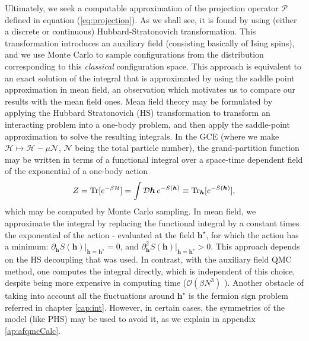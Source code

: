Ultimately, we seek a computable approximation of the projection operator $\mathcal{P}$ defined in equation (\ref{eq:projection}).
As we shall see, it is found by using (either a discrete or continuous) Hubbard-Stratonovich transformation.
This transformation introduces an auxiliary field (consisting basically of Ising spins), and we use Monte Carlo to sample configurations from the distribution corresponding to this \emph{classical} configuration space.
This approach is equivalent to an exact solution of the integral that is approximated by using the saddle point approximation in mean field, an observation which motivates us to compare our results with the mean field ones.
Mean field theory may be formulated by applying the Hubbard Stratonovich (HS)  transformation to transform an interacting problem into a one-body problem, and then apply the saddle-point approximation to solve the resulting integrals.
In the \acs{GCE} (where we make $\mathcal{H} \mapsto \mathcal{H} - \mu \mathcal{N}$, $\mathcal{N}$ being the total particle number), the grand-partition function may be written in terms of a functional integral over a space-time dependent field of the exponential of a one-body action
\begin{equation}
Z = \operatorname{Tr} [ e^{-\beta \mathcal{H} } ] = \int \mathcal{D}\bm h \, e^{-S(\bm h) }  \equiv \operatorname{Tr}_{\bm h} [ e^{-S(\bm h)} ],
\end{equation}
which may be computed by Monte Carlo sampling.
In mean field, we approximate the integral by replacing the functional integral by a constant times the exponential of the action - evaluated at the field $\bm h^\star$, for which the action has a minimum: $\partial_{\bm h} S( \bm h ) |_{\bm h = \bm h^\star} = 0$, and $\partial_{\bm h}^2 S( \bm h ) |_{\bm h = \bm h^\star} > 0$.
This approach depends on the HS decoupling that was used.
In contrast, with the auxiliary field \ac{QMC} method, one computes the integral directly, which is independent of this choice, despite being more expensive in computing time ($\mathcal{O}(\beta N^3)$ ).
Another obstacle of taking into account all the fluctuations around $\bm h^\star$ is the fermion sign problem referred in chapter \ref{cap:int}.
However, in certain cases, the symmetries of the model (like \ac{PHS}) may be used to avoid it, as we explain in appendix \ref{ap:afqmcCalc}.
